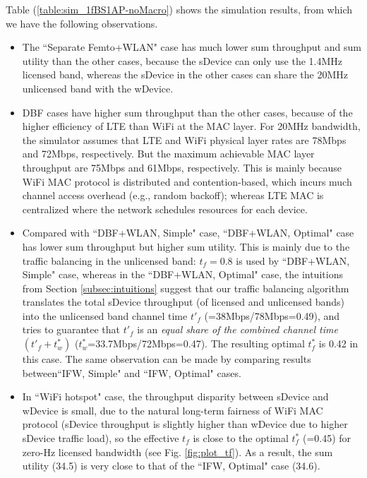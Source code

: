 \documentclass[journal,final,letterpaper,10pt,doublecolumn,twoside]{IEEEtran}
\begin{document}
Table (\ref{table:sim_1fBS1AP-noMacro}) shows the simulation results, from which we have the following observations.
\begin{itemize}
  \item The ``Separate Femto+WLAN" case has much lower sum throughput and sum utility than the other cases, because the sDevice can only use the 1.4MHz licensed band, whereas the sDevice in the other cases can share the 20MHz unlicensed band with the wDevice.
  \item DBF cases have higher sum throughput than the other cases, because of the higher efficiency of LTE than WiFi at the MAC layer. For 20MHz bandwidth, the simulator assumes that LTE and WiFi physical layer rates are 78Mbps and 72Mbps, respectively. But the maximum achievable MAC layer throughput are 75Mbps and 61Mbps, respectively. This is mainly because WiFi MAC protocol is distributed and contention-based, which incurs much channel access overhead (e.g., random backoff); whereas LTE MAC is centralized where the network schedules resources for each device.
  \item Compared with ``DBF+WLAN, Simple" case, ``DBF+WLAN, Optimal" case has lower sum throughput but higher sum utility. This is mainly due to the traffic balancing in the unlicensed band: $t_f=0.8$ is used by ``DBF+WLAN, Simple" case, whereas in the ``DBF+WLAN, Optimal" case, the intuitions from Section \ref{subsec:intuitions} suggest that our traffic balancing algorithm translates the total sDevice throughput (of licensed and unlicensed bands) into the unlicensed band channel time $t'_f$ (=38Mbps/78Mbps=0.49), and tries to guarantee  that $t'_f$ is an \emph{equal share of the combined channel time} $(t'_f+t_w^*)$ ($t_w^*$=33.7Mbps/72Mbps=0.47). The resulting optimal $t^*_f$ is 0.42 in this case.
       The same observation can be made by comparing results between``IFW, Simple" and ``IFW, Optimal" cases.
  \item In ``WiFi hotspot" case, the throughput disparity between sDevice and wDevice is small, due to the natural long-term fairness of WiFi MAC protocol (sDevice throughput is slightly higher than wDevice due to higher sDevice traffic load), so the effective $t_f$ is close to the optimal $t^*_f$ (=0.45) for zero-Hz licensed bandwidth  (see Fig. \ref{fig:plot_tf}). As a result, the sum utility (34.5) is very close to that of the ``IFW, Optimal" case (34.6).

\end{itemize}
\end{document}
